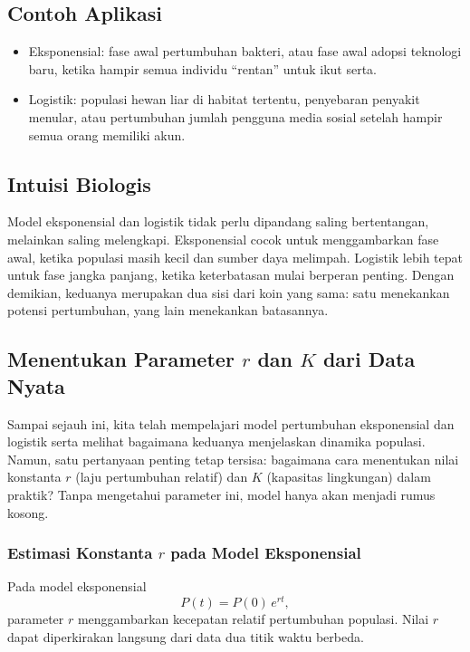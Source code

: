 \documentclass{bukumjh}
\begin{document}
\subsection*{Contoh Aplikasi}

\begin{itemize}
    \item {\jsg Eksponensial:} fase awal pertumbuhan bakteri, atau fase awal adopsi teknologi baru, ketika hampir semua individu “rentan” untuk ikut serta.
    \item {\jsg Logistik:} populasi hewan liar di habitat tertentu, penyebaran penyakit menular, atau pertumbuhan jumlah pengguna media sosial setelah hampir semua orang memiliki akun.
\end{itemize}

\subsection*{Intuisi Biologis}

Model eksponensial dan logistik tidak perlu dipandang saling bertentangan, melainkan saling melengkapi. Eksponensial cocok untuk menggambarkan {\jsg fase awal}, ketika populasi masih kecil dan sumber daya melimpah. Logistik lebih tepat untuk {\jsg fase jangka panjang}, ketika keterbatasan mulai berperan penting. Dengan demikian, keduanya merupakan dua sisi dari koin yang sama: satu menekankan potensi pertumbuhan, yang lain menekankan batasannya.

\subsection*{Menentukan Parameter $r$ dan $K$ dari Data Nyata}

Sampai sejauh ini, kita telah mempelajari model pertumbuhan eksponensial dan logistik serta melihat bagaimana keduanya menjelaskan dinamika populasi. Namun, satu pertanyaan penting tetap tersisa: bagaimana cara menentukan nilai konstanta $r$ (laju pertumbuhan relatif) dan $K$ (kapasitas lingkungan) dalam praktik? Tanpa mengetahui parameter ini, model hanya akan menjadi rumus kosong. 

\subsubsection*{Estimasi Konstanta $r$ pada Model Eksponensial}

Pada model eksponensial
\[
P(t) = P(0)\, e^{rt},
\]
parameter $r$ menggambarkan kecepatan relatif pertumbuhan populasi. Nilai $r$ dapat diperkirakan langsung dari data dua titik waktu berbeda.
\end{document}
